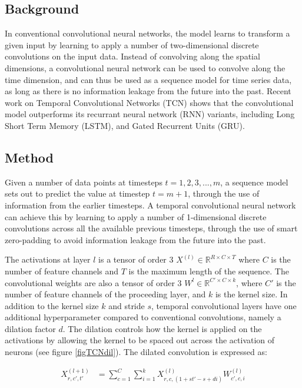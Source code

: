 \documentclass[a4paper, twoside]{article}
\begin{document}
\subsection{Background}
In conventional convolutional neural networks, the model learns to transform a given input by learning to apply a number of two-dimensional discrete convolutions on the input data. Instead of convolving along the spatial dimensions, a convolutional neural network can be used to convolve along the time dimension, and can thus be used as a sequence model for time series data, as long as there is no information leakage from the future into the past. Recent work on Temporal Convolutional Networks (TCN) \cite{tcn} shows that the convolutional model outperforms its recurrant neural network (RNN) variants, including Long Short Term Memory (LSTM), and Gated Recurrent Units (GRU). 

\subsection{Method}
Given a number of data points at timesteps $t = 1, 2, 3, ..., m$, a sequence model sets out to predict the value at timestep $t = m+1$, through the use of information from the earlier timesteps. A temporal convolutional neural network can achieve this by learning to apply a number of 1-dimensional discrete convolutions across all the available previous timesteps, through the use of smart zero-padding to avoid information leakage from the future into the past.

The activations at layer $l$ is a tensor of order 3 $X^{(l)} \in \mathbb{R}^{R \times C \times T}$ where $C$ is the number of feature channels and $T$ is the maximum length of the sequence. The convolutional weights are also a tensor of order 3 $W^l \in \mathbb{R}^{C' \times C \times k}$, where $C'$ is the number of feature channels of the proceeding layer, and $k$ is the kernel size. In addition to the kernel size $k$ and stride $s$, temporal convolutional layers have one additional hyperparameter compared to conventional convolutions, namely a dilation factor $d$. The dilation controls how the kernel is applied on the activations by allowing the kernel to be spaced out across the activation of neurons (see figure \ref{figTCNdil}). The dilated convolution is expressed as:

\begin{equation}
\begin{split}
	X^{(l+1)}_{r, c', t'}	
		& = \sum^{C}_{c=1} \sum^{k}_{i=1} X^{(l)}_{r, c, (1 + st'-s+di)}W^{(l)}_{c', c, i}
\end{split}
\end{equation}
\end{document}
